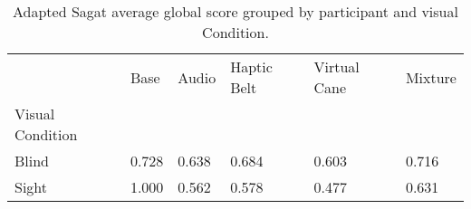 
\begin{table}[!htb]
\centering
\caption{Adapted Sagat average global score grouped by participant and visual Condition.}
\label{tab:sagat_average_group}
\begin{tabular}{llllll}
\toprule
{} &  Base &  Audio &  Haptic Belt &  Virtual Cane &  Mixture \\
Visual Condition &       &        &              &               &          \\
\midrule
Blind            & 0.728 &  0.638 &        0.684 &         0.603 &    0.716 \\
Sight            & 1.000 &  0.562 &        0.578 &         0.477 &    0.631 \\
\bottomrule
\end{tabular}
\end{table}

